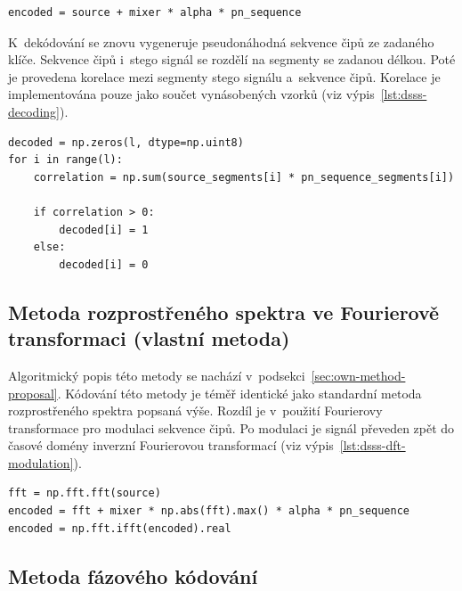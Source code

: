 \begin{lstlisting}[language=PythonPlus, label={lst:dsss-modulation},
caption={Modulace krycího signálu, rozprostřených bitů a~pseudonáhodné sekvence
čipů.}]
encoded = source + mixer * alpha * pn_sequence
\end{lstlisting}

K~dekódování se znovu vygeneruje pseudonáhodná sekvence čipů ze zadaného klíče.
Sekvence čipů i~stego signál se rozdělí na segmenty se zadanou délkou. Poté je
provedena korelace mezi segmenty stego signálu a~sekvence čipů. Korelace je
implementována pouze jako součet vynásobených vzorků (viz
výpis~\ref{lst:dsss-decoding}).

\begin{lstlisting}[language=PythonPlus, label={lst:dsss-decoding},
caption={Korelace segmentů a~rozhodovací pravidlo.}]
decoded = np.zeros(l, dtype=np.uint8)
for i in range(l):
    correlation = np.sum(source_segments[i] * pn_sequence_segments[i])

    if correlation > 0:
        decoded[i] = 1
    else:
        decoded[i] = 0
\end{lstlisting}

\subsection*{Metoda rozprostřeného spektra ve Fourierově transformaci (vlastní
metoda)}
\label{sub:dsssdft-implementation}

Algoritmický popis této metody se nachází
v~podsekci~\ref{sec:own-method-proposal}. Kódování této metody je téměř
identické jako standardní metoda rozprostřeného spektra popsaná výše. Rozdíl je
v~použití Fourierovy transformace pro modulaci sekvence čipů. Po modulaci je
signál převeden zpět do časové domény inverzní Fourierovou transformací (viz
výpis~\ref{lst:dsss-dft-modulation}).

\begin{lstlisting}[language=PythonPlus, label={lst:dsss-dft-modulation},
caption={Modulace Fourierovy transformace krycího signálu, rozprostřených bitů
a~pseudonáhodné sekvence čipů.}]
fft = np.fft.fft(source)
encoded = fft + mixer * np.abs(fft).max() * alpha * pn_sequence
encoded = np.fft.ifft(encoded).real
\end{lstlisting}

\subsection*{Metoda fázového kódování}
\label{sub:phase-coding-implementation}

